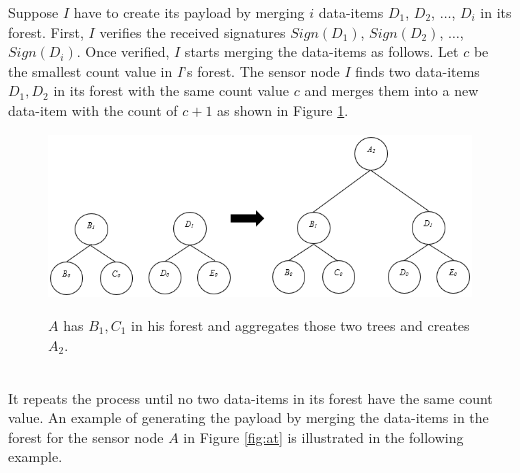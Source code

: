 	Suppose $I$ have to create its payload by merging $i$ data-items $D_{1}$, $D_{2}$, $\dotsc$, $D_{i}$ in its forest.
	First, $I$ verifies the received signatures $Sign(D_{1})$, $Sign(D_{2})$, $\dotsc$, $Sign(D_{i})$.
	Once verified, $I$ starts merging the data-items as follows.
	Let $c$ be the smallest count value in $I$'s forest.
	The sensor node $I$ finds two data-items $D_{1},D_{2}$ in its forest with the same count value $c$ and merges them into a new data-item with the count of $c+1$ as shown in Figure \ref{fig:increase-height}.
	\begin{figure}[h!]
		\includegraphics[scale = 1]{images/increase-height.png}\\
		\caption{$A$ has $B_{1}, C_{1}$ in his forest and aggregates those two trees and creates $A_{2}$.}
		\label{fig:increase-height}
	\end{figure}\\
	It repeats the process until no two data-items in its forest have the same count value.
	An example of generating the payload by merging the data-items in the forest for the sensor node $A$ in Figure \ref{fig:at} is illustrated in the following example.
